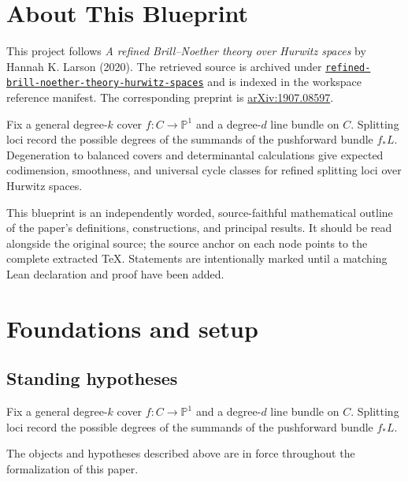 

\chapter*{About This Blueprint}
\label{refined-brill-noether-theory-hurwitz-spaces-about}

This project follows \emph{A refined Brill--Noether theory over Hurwitz spaces} by Hannah K. Larson (2020). The
retrieved source is archived under
\href{../../../../../references/refined-brill-noether-theory-hurwitz-spaces/}{\texttt{refined-brill-noether-theory-hurwitz-spaces}} and is indexed in
the workspace reference manifest. The corresponding preprint is
\href{https://arxiv.org/abs/1907.08597}{arXiv:1907.08597}.

Fix a general degree-$k$ cover $f:C\to\mathbb P^1$ and a degree-$d$ line bundle on $C$. Splitting loci record the possible degrees of the summands of the pushforward bundle $f_*L$. Degeneration to balanced covers and determinantal calculations give expected codimension, smoothness, and universal cycle classes for refined splitting loci over Hurwitz spaces.

This blueprint is an independently worded, source-faithful mathematical
outline of the paper's definitions, constructions, and principal results. It
should be read alongside the original source; the source anchor on each node
points to the complete extracted TeX. Statements are intentionally marked
\notready until a matching Lean declaration and proof have been added.

\chapter{Foundations and setup}
\label{chap:refined-brill-noether-theory-hurwitz-spaces-foundations}

\section{Standing hypotheses}
\label{sec:refined-brill-noether-theory-hurwitz-spaces-standing}

Fix a general degree-$k$ cover $f:C\to\mathbb P^1$ and a degree-$d$ line bundle on $C$. Splitting loci record the possible degrees of the summands of the pushforward bundle $f_*L$.

\begin{convention}
\label{refined-brill-noether-theory-hurwitz-spaces-setup}
The objects and hypotheses described above are in force throughout the
formalization of this paper.
\notready
\end{convention}

